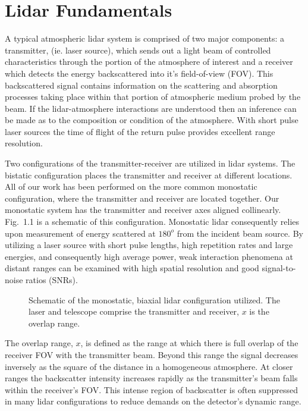 \chapter{Lidar Fundamentals}


A typical atmospheric lidar system is comprised of two major
components: a transmitter, (ie. laser source), 
which sends out a light beam of controlled characteristics through 
the portion of the atmosphere of interest
and a receiver which detects the energy backscattered into 
it's field-of-view (FOV). 
This backscattered signal contains information on the scattering and absorption
processes taking place within 
that portion of atmospheric medium probed by the beam. If the lidar-atmosphere
interactions are understood then an inference can be made 
as to the composition or condition of the atmosphere.
With short pulse laser sources the time of flight of the return
pulse provides excellent range resolution. 

Two configurations of the transmitter-receiver are utilized
in lidar systems. The bistatic configuration places the transmitter 
and receiver at different locations.
All of our work has been performed on the more common 
monostatic configuration, where the transmitter 
and receiver are located together.
Our monostatic system has the transmitter and receiver axes aligned
collinearly. Fig.~{1.1} is a schematic of this configuration.
Monostatic lidar consequently relies upon measurement
of energy scattered at $180^{o}$ from the incident beam source.
By utilizing a laser source with short pulse lengths,
high repetition rates and large energies, and consequently
high average power, weak interaction phenomena 
at distant ranges can be examined with high spatial resolution
and good signal-to-noise ratios (SNRs).

\begin{figure}
\vspace{5.0in}
\caption{Schematic of the monostatic, biaxial lidar configuration
utilized. The laser and telescope comprise the transmitter and receiver,
$x$ is the overlap range.}
\end{figure}

The overlap range, $x$, is defined as the
range at which there is full overlap of the receiver FOV with the
transmitter beam.
Beyond this range the signal decreases inversely as the square of the
distance in a homogeneous atmosphere. At closer ranges 
the backscatter intensity increases rapidly
as the transmitter's beam falls within the receiver's
FOV. This intense region of backscatter
is often suppressed in many lidar configurations to
reduce demands on the detector's dynamic range.

